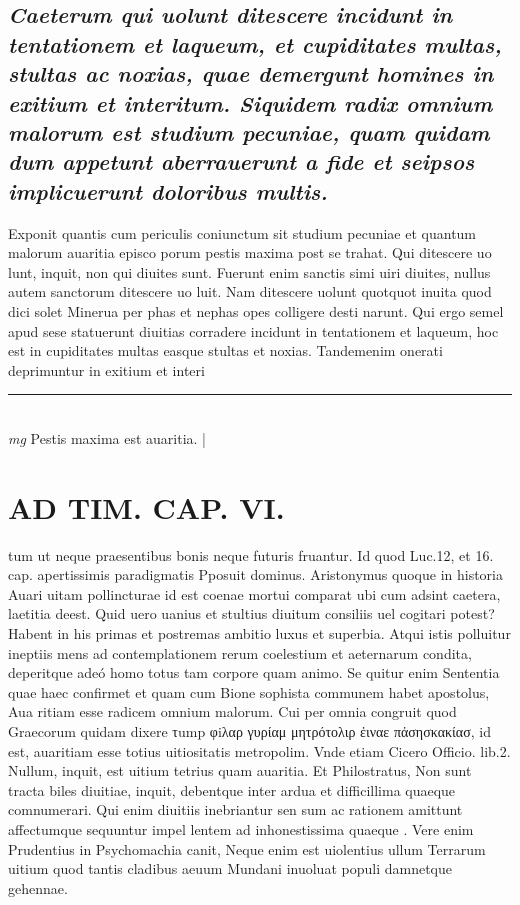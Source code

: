 \documentclass{article}
\begin{document}
\begin{pages}
\subsection*{\textit{Caeterum qui uolunt ditescere incidunt in tentationem et laqueum, et cupiditates multas, stultas ac noxias, quae demergunt homines in exitium et interitum. Siquidem radix omnium malorum est studium pecuniae, quam quidam dum appetunt aberrauerunt a fide et seipsos implicuerunt doloribus multis. }}\pstart Exponit quantis cum periculis coniunctum sit studium pecuniae et quantum malorum auaritia episco porum pestis maxima post se trahat. Qui ditescere uo lunt, inquit, non qui diuites sunt. Fuerunt enim sanctis simi uiri diuites, nullus autem sanctorum ditescere uo luit. Nam ditescere uolunt quotquot inuita quod dici solet Minerua per phas et nephas opes colligere desti narunt. Qui ergo semel apud sese statuerunt diuitias corradere incidunt in tentationem et laqueum, hoc est in cupiditates multas easque stultas et noxias. Tandemenim onerati deprimuntur in exitium et interi\pend
\vspace{0.5cm}\noindent
\vspace{0.2cm}\rule{1cm}{0.2pt}\\ 
\hspace{0.2cm}\textit{mg}
\footnotesize Pestis maxima est auaritia. 
\normalsize| 
\section*{AD TIM. CAP. VI. }
\marginpar{[ p.169 ]}\pstart tum ut neque praesentibus bonis neque futuris fruantur. Id quod Luc.12, et 16. cap. apertissimis paradigmatis Pposuit dominus. Aristonymus quoque in historia Auari uitam pollincturae id est coenae mortui comparat ubi cum adsint caetera, laetitia deest. Quid uero uanius et stultius diuitum consiliis uel cogitari potest? Habent in his primas et postremas ambitio luxus et superbia. Atqui istis polluitur ineptiis mens ad contemplationem rerum coelestium et aeternarum condita, deperitque adeó homo totus tam corpore quam animo. Se quitur enim Sententia quae haec confirmet et quam cum Bione sophista communem habet apostolus, Aua ritiam esse radicem omnium malorum. Cui per omnia congruit quod Graecorum quidam dixere τump φiλαρ γυρίαμ μητρότολιρ ἐιναε πἀσησκακίασ, id est, auaritiam esse totius uitiositatis metropolim. Vnde etiam Cicero Officio. lib.2. Nullum, inquit, est uitium tetrius quam auaritia. Et Philostratus, Non sunt tracta biles diuitiae, inquit, debentque inter ardua et difficillima quaeque comnumerari. Qui enim diuitiis inebriantur sen sum ac rationem amittunt affectumque sequuntur impel lentem ad inhonestissima quaeque . Vere enim Prudentius in Psychomachia canit,  \pend\pstart Neque enim est uiolentius ullum Terrarum uitium quod tantis cladibus aeuum Mundani inuoluat populi damnetque gehennae.  \pend

\end{pages}
\end{document}
